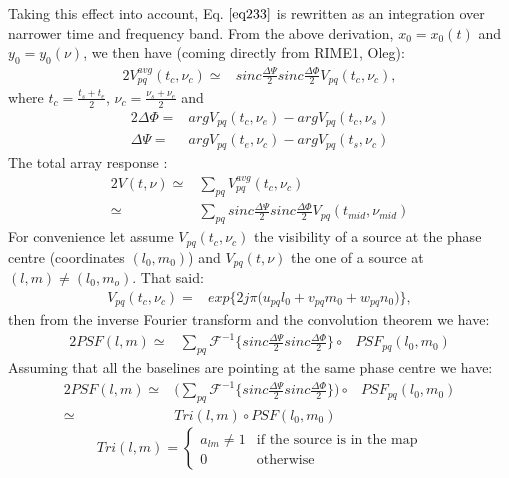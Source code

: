 Taking this effect into account, Eq. $\ref{eq233}$ is  rewritten as an integration over narrower time and frequency band. From the above 
derivation, $x_0=x_0(t)$ and $y_0=y_0(\nu)$, we then have (coming directly from RIME1, Oleg):
\begin{alignat}{2}
 V_{pq}^{avg}(t_c, \nu_c)\simeq& sinc\frac{\Delta \Psi}{2}sinc\frac{\Delta \Phi}{2} V_{pq}(t_{c},\nu_{c})\label{eq:visibility},
\end{alignat}
where $t_{c}=\frac{t_{s} + t_{e}}{2}$, $\nu_{c}=\frac{\nu_{s} + \nu_{e}}{2}$ and 
\begin{alignat}{2}
\Delta \Phi=&arg V_{pq}(t_{c},\nu_{e})-arg V_{pq}(t_{c},\nu_{s})\\
\Delta \Psi=&arg V_{pq}(t_{e},\nu_{c})-arg V_{pq}(t_{s},\nu_{c})
\end{alignat}
The total array response :
\begin{alignat}{2}
V(t,\nu)\simeq&\sum_{pq} V_{pq}^{avg}(t_c, \nu_c)\\
	\simeq&\sum_{pq} sinc\frac{\Delta \Psi}{2}sinc\frac{\Delta \Phi}{2} V_{pq}(t_{mid},\nu_{mid})
\end{alignat}
For convenience let assume $V_{pq}(t_{c},\nu_{c})$ the visibility of a source at the phase centre (coordinates $(l_0,m_0)$) and 
$V_{pq}(t,\nu)$ the one of a source at $(l,m)\neq(l_0,m_o)$. That said:
\begin{eqnarray}
 V_{pq}(t_c, \nu_c)=& exp\bigg\{2j\pi\big(u_{pq}l_0+v_{pq}m_0+ w_{pq}n_0\big)\bigg\},
\end{eqnarray}
then from the inverse Fourier transform and the convolution theorem we have:
\begin{alignat}{2}
PSF(l,m)\simeq& \sum_{pq}\mathcal{F}^{-1}\bigg\{sinc\frac{\Delta \Psi}{2}sinc\frac{\Delta \Phi}{2}\bigg\}
	\circ& PSF_{pq}(l_0,m_0)
\end{alignat}
Assuming that all the baselines are pointing at the same phase centre we have:
\begin{alignat}{2}
PSF(l,m)\simeq&\bigg(\sum_{pq}\mathcal{F}^{-1}\bigg\{sinc\frac{\Delta \Psi}{2}sinc\frac{\Delta \Phi}{2}\bigg\}\bigg)
	\circ& PSF_{pq}(l_0,m_0)\\
      \simeq& Tri(l,m)\circ PSF(l_0,m_0)\label{eqtota}
\end{alignat}
\begin{equation*}
Tri(l,m)=\left\{
\begin{array}{rl}
a_{lm}\neq 1 & \mbox{if the source is in the map} \\
0 & \mbox{otherwise}
\end{array}\right.
\end{equation*}
